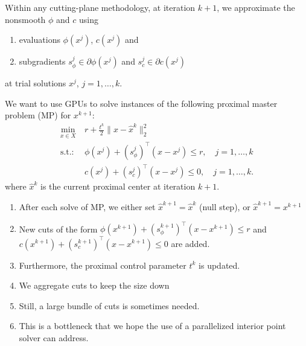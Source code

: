 \documentclass[xcolor=dvipsnames]{beamer}
\begin{document}
\begin{frame}
\begin{footnotesize}
Within any cutting-plane methodology, at iteration $k+1$, we approximate the nonsmooth $\phi$ and $c$ using 
\begin{enumerate}
\item evaluations $\phi(x^j)$, $c(x^j)$ and
\item subgradients $s_\phi^j \in \partial \phi(x^j)$ and $s_c^j \in \partial c(x^j)$ 
\end{enumerate}
at trial solutions $x^j$, $j=1,\dots,k$.

We want to use GPUs 
to solve instances of the following proximal master problem (MP) for $x^{k+1}$:
    \begin{align*}    
      \min_{x \in X } \ & r + \frac{t^k}{2} \| x - \hat{x}^k \|_2^2 \\
        \text{s.t.: } & \phi(x^j) + (s_\phi^j)^\top (x-x^j) \le r, \quad j=1,\dots,k \\
        & c(x^j) + (s_c^j)^\top (x-x^j) \le 0, \quad j=1,\dots,k.
    \end{align*} 
where $\hat{x}^k$ is the current proximal center at iteration $k+1$.
\begin{enumerate}
\item After each solve of MP, we either set $\hat{x}^{k+1}= \hat{x}^k$ (null step), or $\hat{x}^{k+1} = x^{k+1}$
\item New cuts of the form
        $\phi(x^{k+1}) + (s_\phi^{k+1})^\top (x-x^{k+1}) \le r$ and
        $c(x^{k+1}) + (s_c^{k+1})^\top (x-x^{k+1}) \le 0$ are added.
\item Furthermore, the proximal control parameter $t^{k}$ is updated.
\item We aggregate cuts to keep the size down 
\item Still, a large bundle of cuts is sometimes needed.
\item \alert{This is a bottleneck that we hope the use of a parallelized interior point solver can address.}
\end{enumerate}
\end{footnotesize}
\end{frame}
\end{document}
